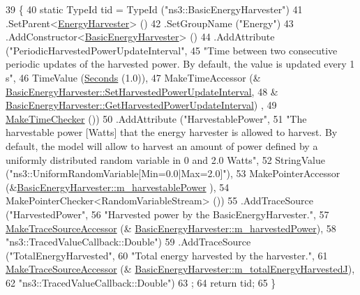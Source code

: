 \begin{DoxyCode}
39 \{
40   \textcolor{keyword}{static} TypeId tid = TypeId (\textcolor{stringliteral}{"ns3::BasicEnergyHarvester"})
41   .SetParent<\hyperlink{classns3_1_1EnergyHarvester_ab6520ad23083bc96b7ca4136b33ea688}{EnergyHarvester}> ()
42   .SetGroupName (\textcolor{stringliteral}{"Energy"})
43   .AddConstructor<\hyperlink{classns3_1_1BasicEnergyHarvester_aadffe6f7262d29b63d84b9e12d4539f5}{BasicEnergyHarvester}> ()
44   .AddAttribute (\textcolor{stringliteral}{"PeriodicHarvestedPowerUpdateInterval"},
45                  \textcolor{stringliteral}{"Time between two consecutive periodic updates of the harvested power. By default, the
       value is updated every 1 s"},
46                  TimeValue (\hyperlink{group__timecivil_ga33c34b816f8ff6628e33d5c8e9713b9e}{Seconds} (1.0)),
47                  MakeTimeAccessor (&
      \hyperlink{classns3_1_1BasicEnergyHarvester_a6e50dec1a1903c158ed701f2dfbe911c}{BasicEnergyHarvester::SetHarvestedPowerUpdateInterval},
48                                    &
      \hyperlink{classns3_1_1BasicEnergyHarvester_a1448fa0e16f31445ba81ea780693c81f}{BasicEnergyHarvester::GetHarvestedPowerUpdateInterval})
      ,
49                  \hyperlink{group__time_ga7032965bd4afa578691d88c09e4481c1}{MakeTimeChecker} ())
50   .AddAttribute (\textcolor{stringliteral}{"HarvestablePower"},
51                  \textcolor{stringliteral}{"The harvestable power [Watts] that the energy harvester is allowed to harvest. By
       default, the model will allow to harvest an amount of power defined by a uniformly distributed random variable in 0
       and 2.0 Watts"},
52                  StringValue (\textcolor{stringliteral}{"ns3::UniformRandomVariable[Min=0.0|Max=2.0]"}),
53                  MakePointerAccessor (&\hyperlink{classns3_1_1BasicEnergyHarvester_a0db55946a8ce3ff8a854754e26bc26ba}{BasicEnergyHarvester::m\_harvestablePower}
      ),
54                  MakePointerChecker<RandomVariableStream> ())
55   .AddTraceSource (\textcolor{stringliteral}{"HarvestedPower"},
56                    \textcolor{stringliteral}{"Harvested power by the BasicEnergyHarvester."},
57                    \hyperlink{group__tracing_gab21a770b9855af4e8f69f7531ea4a6b0}{MakeTraceSourceAccessor} (&
      \hyperlink{classns3_1_1BasicEnergyHarvester_a0ba39c8a284e81584ab5af5ccdc3e898}{BasicEnergyHarvester::m\_harvestedPower}),
58                    \textcolor{stringliteral}{"ns3::TracedValueCallback::Double"})
59   .AddTraceSource (\textcolor{stringliteral}{"TotalEnergyHarvested"},
60                    \textcolor{stringliteral}{"Total energy harvested by the harvester."},
61                    \hyperlink{group__tracing_gab21a770b9855af4e8f69f7531ea4a6b0}{MakeTraceSourceAccessor} (&
      \hyperlink{classns3_1_1BasicEnergyHarvester_a87500c5e34a0f4cf246b20bd7b25a3d0}{BasicEnergyHarvester::m\_totalEnergyHarvestedJ}),
62                    \textcolor{stringliteral}{"ns3::TracedValueCallback::Double"})
63   ;
64   \textcolor{keywordflow}{return} tid;
65 \}
\end{DoxyCode}


